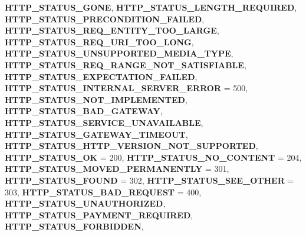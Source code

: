 \begin{DoxyCompactItemize}
{\bfseries H\+T\+T\+P\+\_\+\+S\+T\+A\+T\+U\+S\+\_\+\+G\+O\+NE}, 
{\bfseries H\+T\+T\+P\+\_\+\+S\+T\+A\+T\+U\+S\+\_\+\+L\+E\+N\+G\+T\+H\+\_\+\+R\+E\+Q\+U\+I\+R\+ED}, 
{\bfseries H\+T\+T\+P\+\_\+\+S\+T\+A\+T\+U\+S\+\_\+\+P\+R\+E\+C\+O\+N\+D\+I\+T\+I\+O\+N\+\_\+\+F\+A\+I\+L\+ED}, 
\newline
{\bfseries H\+T\+T\+P\+\_\+\+S\+T\+A\+T\+U\+S\+\_\+\+R\+E\+Q\+\_\+\+E\+N\+T\+I\+T\+Y\+\_\+\+T\+O\+O\+\_\+\+L\+A\+R\+GE}, 
{\bfseries H\+T\+T\+P\+\_\+\+S\+T\+A\+T\+U\+S\+\_\+\+R\+E\+Q\+\_\+\+U\+R\+I\+\_\+\+T\+O\+O\+\_\+\+L\+O\+NG}, 
{\bfseries H\+T\+T\+P\+\_\+\+S\+T\+A\+T\+U\+S\+\_\+\+U\+N\+S\+U\+P\+P\+O\+R\+T\+E\+D\+\_\+\+M\+E\+D\+I\+A\+\_\+\+T\+Y\+PE}, 
{\bfseries H\+T\+T\+P\+\_\+\+S\+T\+A\+T\+U\+S\+\_\+\+R\+E\+Q\+\_\+\+R\+A\+N\+G\+E\+\_\+\+N\+O\+T\+\_\+\+S\+A\+T\+I\+S\+F\+I\+A\+B\+LE}, 
\newline
{\bfseries H\+T\+T\+P\+\_\+\+S\+T\+A\+T\+U\+S\+\_\+\+E\+X\+P\+E\+C\+T\+A\+T\+I\+O\+N\+\_\+\+F\+A\+I\+L\+ED}, 
{\bfseries H\+T\+T\+P\+\_\+\+S\+T\+A\+T\+U\+S\+\_\+\+I\+N\+T\+E\+R\+N\+A\+L\+\_\+\+S\+E\+R\+V\+E\+R\+\_\+\+E\+R\+R\+OR} = 500, 
{\bfseries H\+T\+T\+P\+\_\+\+S\+T\+A\+T\+U\+S\+\_\+\+N\+O\+T\+\_\+\+I\+M\+P\+L\+E\+M\+E\+N\+T\+ED}, 
{\bfseries H\+T\+T\+P\+\_\+\+S\+T\+A\+T\+U\+S\+\_\+\+B\+A\+D\+\_\+\+G\+A\+T\+E\+W\+AY}, 
\newline
{\bfseries H\+T\+T\+P\+\_\+\+S\+T\+A\+T\+U\+S\+\_\+\+S\+E\+R\+V\+I\+C\+E\+\_\+\+U\+N\+A\+V\+A\+I\+L\+A\+B\+LE}, 
{\bfseries H\+T\+T\+P\+\_\+\+S\+T\+A\+T\+U\+S\+\_\+\+G\+A\+T\+E\+W\+A\+Y\+\_\+\+T\+I\+M\+E\+O\+UT}, 
{\bfseries H\+T\+T\+P\+\_\+\+S\+T\+A\+T\+U\+S\+\_\+\+H\+T\+T\+P\+\_\+\+V\+E\+R\+S\+I\+O\+N\+\_\+\+N\+O\+T\+\_\+\+S\+U\+P\+P\+O\+R\+T\+ED}, 
{\bfseries H\+T\+T\+P\+\_\+\+S\+T\+A\+T\+U\+S\+\_\+\+OK} = 200, 
\newline
{\bfseries H\+T\+T\+P\+\_\+\+S\+T\+A\+T\+U\+S\+\_\+\+N\+O\+\_\+\+C\+O\+N\+T\+E\+NT} = 204, 
{\bfseries H\+T\+T\+P\+\_\+\+S\+T\+A\+T\+U\+S\+\_\+\+M\+O\+V\+E\+D\+\_\+\+P\+E\+R\+M\+A\+N\+E\+N\+T\+LY} = 301, 
{\bfseries H\+T\+T\+P\+\_\+\+S\+T\+A\+T\+U\+S\+\_\+\+F\+O\+U\+ND} = 302, 
{\bfseries H\+T\+T\+P\+\_\+\+S\+T\+A\+T\+U\+S\+\_\+\+S\+E\+E\+\_\+\+O\+T\+H\+ER} = 303, 
\newline
{\bfseries H\+T\+T\+P\+\_\+\+S\+T\+A\+T\+U\+S\+\_\+\+B\+A\+D\+\_\+\+R\+E\+Q\+U\+E\+ST} = 400, 
{\bfseries H\+T\+T\+P\+\_\+\+S\+T\+A\+T\+U\+S\+\_\+\+U\+N\+A\+U\+T\+H\+O\+R\+I\+Z\+ED}, 
{\bfseries H\+T\+T\+P\+\_\+\+S\+T\+A\+T\+U\+S\+\_\+\+P\+A\+Y\+M\+E\+N\+T\+\_\+\+R\+E\+Q\+U\+I\+R\+ED}, 
{\bfseries H\+T\+T\+P\+\_\+\+S\+T\+A\+T\+U\+S\+\_\+\+F\+O\+R\+B\+I\+D\+D\+EN}, 

\end{DoxyCompactItemize}
